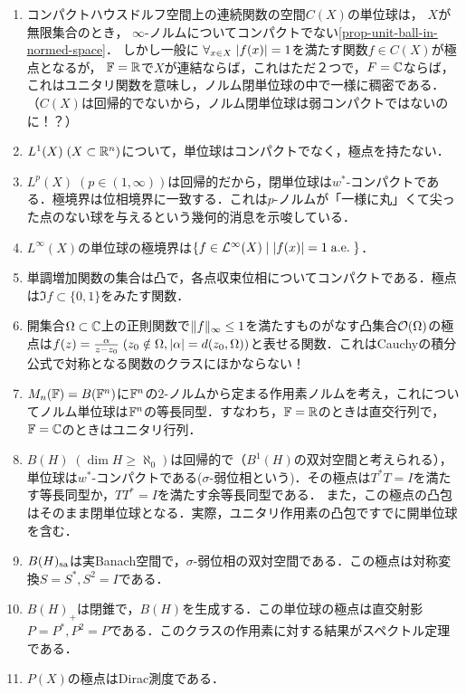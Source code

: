 \documentclass[uplatex,dvipdfmx]{jsreport}
\begin{document}
\begin{example}[凸集合の極点]\mbox{}
    \begin{enumerate}
        \item コンパクトハウスドルフ空間上の連続関数の空間$C(X)$の単位球は，
        $X$が無限集合のとき，
        $\infty$-ノルムについてコンパクトでない\ref{prop-unit-ball-in-normed-space}．
        しかし一般に
        $\forall_{x\in X}\;\lvert f(x)\rvert=1$を満たす関数$f\in C(X)$が極点となるが，
        $\mathbb{F}=\mathbb{R}$で$X$が連結ならば，これはただ２つで，$F=\mathbb{C}$ならば，これはユニタリ関数を意味し，ノルム閉単位球の中で一様に稠密である．
        （$C(X)$は回帰的でないから，ノルム閉単位球は弱コンパクトではないのに！？）
        \item $L^1(X)\;(X\subset\mathbb{R}^n)$について，単位球はコンパクトでなく，極点を持たない．
        \item $L^p(X)\;(p\in(1,\infty))$は回帰的だから，閉単位球は$w^*$-コンパクトである．極境界は位相境界に一致する．これは$p$-ノルムが「一様に丸」くて尖った点のない球を与えるという幾何的消息を示唆している．
        \item $L^\infty(X)$の単位球の極境界は$\left\{f\in \mathcal{L}^\infty(X)\mid\lvert f(x)\rvert=1\;\mathrm{a.e.}\;\right\}$．
        \item 単調増加関数の集合は凸で，各点収束位相についてコンパクトである．極点は$\Im f\subset\{0,1\}$をみたす関数．
        \item 開集合$\Omega\subset\mathbb{C}$上の正則関数で$\|f\|_\infty\le1$を満たすものがなす凸集合$\mathcal{O}(\Omega)$の極点は$f(z)=\frac{\alpha}{z-z_0}\;(z_0\notin\Omega,\lvert\alpha\rvert=d(z_0,\Omega))$と表せる関数．これはCauchyの積分公式で対称となる関数のクラスにほかならない！
        \item $M_n(\mathbb{F})=B(\mathbb{F}^n)$に$\mathbb{F}^n$の$2$-ノルムから定まる作用素ノルムを考え，これについてノルム単位球は$\mathbb{F}^n$の等長同型．すなわち，$\mathbb{F}=\mathbb{R}$のときは直交行列で，$\mathbb{F}=\mathbb{C}$のときはユニタリ行列．
        \item $B(H)\;(\dim H\ge\aleph_0)$は回帰的で（$B^1(H)$の双対空間と考えられる），単位球は$w^*$-コンパクトである($\sigma$-弱位相という)．その極点は$T^*T=I$を満たす等長同型か，$TT^*=I$を満たす余等長同型である．
        また，この極点の凸包はそのまま閉単位球となる．実際，ユニタリ作用素の凸包ですでに開単位球を含む．
        \item $B(H)_{\mathrm{sa}}$は実Banach空間で，$\sigma$-弱位相の双対空間である．この極点は対称変換$S=S^*,S^2=I$である．
        \item $B(H)_+$は閉錐で，$B(H)$を生成する．この単位球の極点は直交射影$P=P^*,P^2=P$である．このクラスの作用素に対する結果がスペクトル定理である．
        \item $P(X)$の極点はDirac測度である．
    \end{enumerate}
\end{example}
\end{document}
